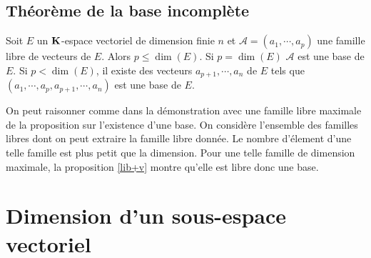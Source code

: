 \subsection{Théorème de la base incomplète}
 \label{tbi}
\begin{thmn}
 Soit $E$ un $\mathbf{K}$-espace vectoriel de dimension finie $n$ et $\mathcal{A}=(a_1,\cdots,a_p)$ une famille libre de vecteurs de $E$. Alors $p\leq \dim(E)$. Si $p=\dim(E)$ $\mathcal{A}$ est une base de $E$. Si $p<\dim(E)$, il existe des vecteurs $a_{p+1},\cdots,a_n$ de $E$ tels que $(a_1,\cdots,a_p,a_{p+1},\cdots,a_n)$ est une base de $E$.
\end{thmn}
 \begin{demo}
On peut raisonner comme dans la démonstration avec une famille libre maximale de la proposition sur l'existence d'une base. On considère l'ensemble des familles libres dont on peut extraire la famille libre donnée. Le nombre d'élement d'une telle famille est plus petit que la dimension. Pour une telle famille de dimension maximale, la proposition \ref{lib+v} montre qu'elle est libre donc une base.
 \end{demo}

\section{Dimension d'un sous-espace vectoriel}

